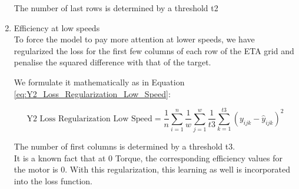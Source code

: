 \documentclass{report} %
\begin{document}
\begin{enumerate}

\vspace{0.2cm} %


The number of last rows is determined by a threshold t2

\item Efficiency at low speeds \\

To force the model to pay more attention at lower speeds, we have regularized the loss for the first few columns of each row of the ETA grid and penalise the squared difference with that of the target.

We formulate it mathematically as in Equation \ref{eq:Y2_Loss_Regularization_Low_Speed}:

\begin{equation}
    \text{Y2 Loss Regularization Low Speed} = \frac{1}{n} \sum_{i=1}^{n} \frac{1}{w} \sum_{j=1}^{w} \frac{1}{t3} \sum_{k=1}^{t3} (y_{ijk} - \hat{y}_{ijk})^2
    \label{eq:Y2_Loss_Regularization_Low_Speed}
\end{equation}


\vspace{0.2cm} %

The number of first columns is determined by a threshold t3. \\
It is a known fact that at 0 Torque, the corresponding efficiency values for the motor is 0. With this regularization, this learning as well is incorporated into the loss function.\\


\end{enumerate}
\end{document}
